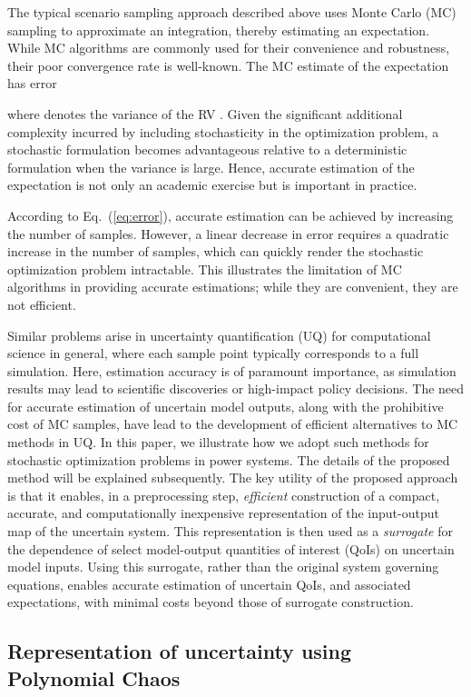\documentclass[conference]{IEEEtran}
\begin{document}
The typical scenario sampling approach described above uses
Monte Carlo (MC) sampling to approximate an integration, thereby estimating an
expectation.  While  MC algorithms are commonly used for their convenience and
robustness, their poor convergence rate is well-known.  The MC estimate of the
expectation has error
 
where  denotes the variance of the RV .  Given the significant
additional complexity incurred by including stochasticity in the optimization
problem, a stochastic  formulation becomes advantageous relative to a deterministic
formulation when the variance is large.  Hence, accurate estimation of the
expectation is not only an academic exercise but is important in practice.

According to Eq.~(\ref{eq:error}), accurate estimation can be achieved by increasing the 
number of samples. However, a linear decrease in error requires a quadratic increase
in the number of samples, which can quickly render the stochastic optimization
problem intractable. This illustrates the limitation of MC
algorithms in providing accurate estimations; while they are convenient, they are
not efficient. 

Similar problems arise in uncertainty quantification (UQ) for computational
science in general, where each sample point typically corresponds to a full
simulation.  Here, estimation accuracy is of paramount
importance, as simulation results may lead to scientific discoveries  or
high-impact policy decisions. The need for accurate estimation of uncertain
model outputs, along with the prohibitive cost of MC samples, have lead to the
development of efficient alternatives to MC methods in UQ. In this paper, we
illustrate how we adopt such methods for stochastic optimization problems
in power systems.  The details of the proposed method will be explained 
subsequently. The key utility of the proposed approach is that it enables, in a
preprocessing step, \emph{efficient} construction of a compact, accurate, and
computationally inexpensive representation of the input-output map of the
uncertain system. This representation is then used as a \emph{surrogate} for
the dependence of select model-output quantities of interest (QoIs) on uncertain
model inputs. Using this surrogate, rather than the original system governing
equations, enables accurate estimation of uncertain QoIs, and associated
expectations, with minimal costs beyond those of surrogate construction.

\subsection{Representation of uncertainty using Polynomial Chaos} 
\end{document}
